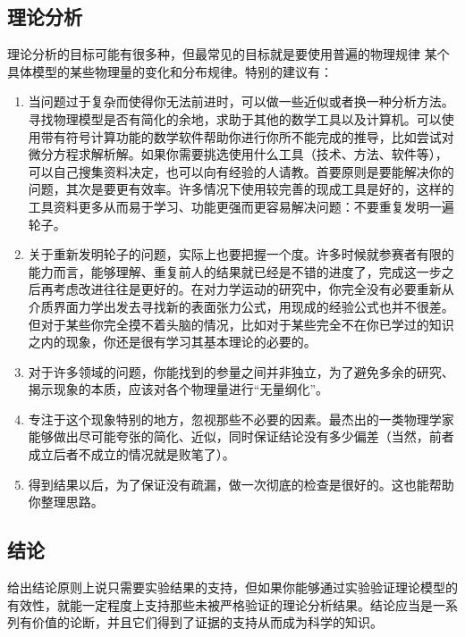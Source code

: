 \documentclass[a4paper,10pt,english]{sphinxmanual}
\begin{document}
\subsection{理论分析}
\label{\detokenize{5. Research:id8}}
理论分析的目标可能有很多种，但最常见的目标就是要使用普遍的物理规律  某个具体模型的某些物理量的变化和分布规律。特别的建议有：
\begin{enumerate}
\item {} 
当问题过于复杂而使得你无法前进时，可以做一些近似或者换一种分析方法。寻找物理模型是否有简化的余地，求助于其他的数学工具以及计算机。可以使用带有符号计算功能的数学软件帮助你进行你所不能完成的推导，比如尝试对微分方程求解析解。如果你需要挑选使用什么工具（技术、方法、软件等），可以自己搜集资料决定，也可以向有经验的人请教。首要原则是要能解决你的问题，其次是要更有效率。许多情况下使用较完善的现成工具是好的，这样的工具资料更多从而易于学习、功能更强而更容易解决问题：不要重复发明一遍轮子。

\item {} 
关于重新发明轮子的问题，实际上也要把握一个度。许多时候就参赛者有限的能力而言，能够理解、重复前人的结果就已经是不错的进度了，完成这一步之后再考虑改进往往是更好的。在对力学运动的研究中，你完全没有必要重新从介质界面力学出发去寻找新的表面张力公式，用现成的经验公式也并不很差。但对于某些你完全摸不着头脑的情况，比如对于某些完全不在你已学过的知识之内的现象，你还是很有学习其基本理论的必要的。

\item {} 
对于许多领域的问题，你能找到的参量之间并非独立，为了避免多余的研究、揭示现象的本质，应该对各个物理量进行“无量纲化”。

\item {} 
专注于这个现象特别的地方，忽视那些不必要的因素。最杰出的一类物理学家能够做出尽可能夸张的简化、近似，同时保证结论没有多少偏差（当然，前者成立后者不成立的情况就是败笔了）。

\item {} 
得到结果以后，为了保证没有疏漏，做一次彻底的检查是很好的。这也能帮助你整理思路。

\end{enumerate}


\subsection{结论}
\label{\detokenize{5. Research:id9}}
给出结论原则上说只需要实验结果的支持，但如果你能够通过实验验证理论模型的有效性，就能一定程度上支持那些未被严格验证的理论分析结果。结论应当是一系列有价值的论断，并且它们得到了证据的支持从而成为科学的知识。
\end{document}
